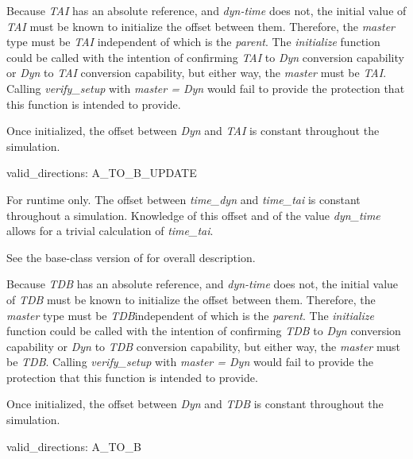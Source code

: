 {\begin{enumerate}
{\begin{enumerate}
Because \textit{TAI} has an absolute reference, and \textit{dyn-time}
does not, the initial value of \textit{TAI} must be known to initialize
the offset between them.  Therefore, the \textit{master} type must be
\textit{TAI} independent of which is the \textit{parent}.  The
\textit{initialize} function could be called with the intention of
confirming \textit{TAI} to \textit{Dyn} conversion capability or
\textit{Dyn} to \textit{TAI} conversion capability, but either way, the
\textit{master} must be \textit{TAI}. Calling \textit{verify\_setup}
with\textit{ master = Dyn }would fail to provide the protection that
this function is intended to provide.

Once initialized, the offset between \textit{Dyn} and \textit{TAI} is
constant throughout the simulation.

valid\_directions:
A\_TO\_B\_UPDATE

For runtime only.  The offset between \textit{time\_dyn} and
\textit{time\_tai }is constant throughout a simulation. 
Knowledge of this
offset and of the value \textit{dyn\_time} allows for a trivial calculation of
\textit{time\_tai}.
\end{enumerate}} 





{\begin{enumerate}
\label{ref:TimeConverterdyntdbinitialize}
See the base-class version of 
 for overall description.

Because \textit{TDB} has an absolute reference, and \textit{dyn-time}
does not, the initial value of \textit{TDB} must be known to initialize
the offset between them.  Therefore, the \textit{master} type must be
\textit{TDB}independent of which is the \textit{parent}.  The
\textit{initialize} function could be called with the intention of
confirming \textit{TDB} to \textit{Dyn} conversion capability or
\textit{Dyn} to \textit{TDB} conversion capability, but either way, the
\textit{master} must be \textit{TDB}. Calling \textit{verify\_setup}
with\textit{ master = Dyn }would fail to provide the protection that
this function is intended to provide.

Once initialized, the offset between \textit{Dyn} and \textit{TDB} is
constant throughout the simulation.

valid\_directions:
A\_TO\_B


\end{enumerate}}
\end{enumerate}}
